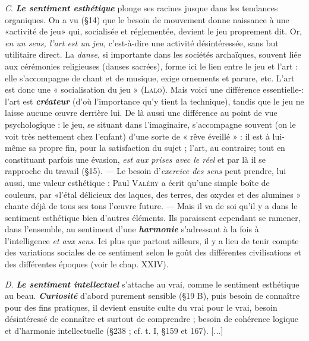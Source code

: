 {\it C}. \textbf{\textit {Le sentiment esthétique}} plonge ses racines jusque dans les tendances
organiques. On a vu (\S14) que le besoin de mouvement
donne naissance à une «activité de jeu» qui, socialisée et réglementée,
devient le jeu proprement dit. Or, {\it en un sens, l'art est un jeu,}
c'est-à-dire une activité désintéressée, sans but utilitaire direct. La
{\it danse}, si importante dans les sociétés archaïques, souvent liée aux
cérémonies religieuses (danses sacrées), forme ici le lien entre le jeu
et l’art : elle s’accompagne de chant et de musique, exige ornements
et parure, etc. L'art est donc une « socialisation du jeu » (\textsc{Lalo}). Mais
voici une différence essentielle-: l’art est \textbf{\textit {créateur}} (d’où l'importance
qu’y tient la technique), tandis que le jeu ne laisse aucune œuvre
derrière lui. De là aussi unc différence au point de vue psychologique :
le jeu, se situant dans l'imaginaire, s’accompagne souvent
(on le voit très nettement chez l’enfant) d’une sorte de « rêve éveillé » :
il est à lui-même sa propre fin, pour la satisfaction du sujet ; l’art, au
contraire; tout en constituant parfois une évasion, {\it est aux prises
avec le réel} et par là il se rapproche du travail (\S 15). — Le besoin
d'{\it exercice des sens} peut prendre, lui aussi, une valeur esthétique :
Paul \textsc{Valéry} a écrit qu’une simple boîte de couleurs, par «l’étal
délicieux des laques, des terres, des oxydes et des alumines » chante
déjà de tous ses tons l’œuvre future. — Mais il va de soi qu'il y a
dans le sentiment esthétique bien d’autres éléments. Ils paraissent
cependant se ramener, dans l’ensemble, au sentiment d’une \textbf{\textit {harmonie}}
s'adressant à la fois à l’intelligence {\it et aux sens}. Ici plus que partout
ailleurs, il y a lieu de tenir compte des variations sociales de ce sentiment
selon le goût des différentes civilisations et des différentes
époques (voir le chap. XXIV).

{\it D}. \textbf{\textit {Le sentiment intellectuel}} s'attache au vrai, comme le sentiment
esthétique au beau. \textbf{\textit {Curiosité}} d’abord purement sensible (\S 19 B),
puis besoin de connaître pour des fins pratiques, il devient ensuite
culte du vrai pour le vrai, besoin désintéressé de connaître et surtout
de comprendre ; besoin de cohérence logique et d’harmonie
intellectuelle (\S 238 ; cf. t. I, \S 159 et 167).
 [...]
